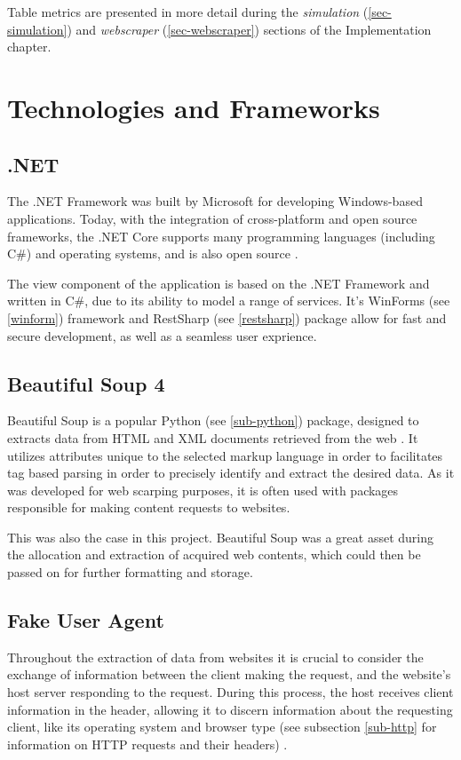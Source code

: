 \documentclass{thesis-ekf}
\theoremstyle{definition}
\theoremstyle{remark}
\begin{document}
{Table metrics are presented in more detail during the \emph{simulation} (\ref{sec-simulation}) and \emph{webscraper} (\ref{sec-webscraper}) sections of the Implementation chapter.

\section{Technologies and Frameworks}

\subsection{.NET}
The .NET Framework was built by Microsoft for developing Windows-based applications. Today, with the integration of cross-platform and open source frameworks, the .NET Core supports many programming languages (including C\#) and operating systems, and is also open source \cite{.net}.

The view component of the application is based on the .NET Framework and written in C\#, due to its ability to model a range of services. It's WinForms (see \ref{winform}) framework and RestSharp (see \ref{restsharp}) package allow for fast and secure development, as well as a seamless user exprience.

\subsection{Beautiful Soup 4}
Beautiful Soup  is a popular Python (see \ref{sub-python}) package, designed to extracts data from HTML 
and XML documents retrieved from the web \cite{bs4}. It utilizes attributes unique to the selected markup language in order to facilitates tag based parsing in order to precisely identify and extract the desired data. As it was developed for web scarping purposes, it is often used with packages responsible for making content requests to websites. 

This was also the case in this project. Beautiful Soup was a great asset during the allocation and extraction of acquired web contents, which could then be passed on for further formatting and storage.

\subsection{Fake User Agent}
Throughout the extraction of data from websites it is crucial to consider the exchange of information between the client making the request, and the website's host server responding to the request. During this process, the host receives client information in the header, allowing it to discern information about the requesting client, like its operating system and browser type (see subsection \ref{sub-http} for information on HTTP requests and their headers) \cite{req-head}.

}
\end{document}
